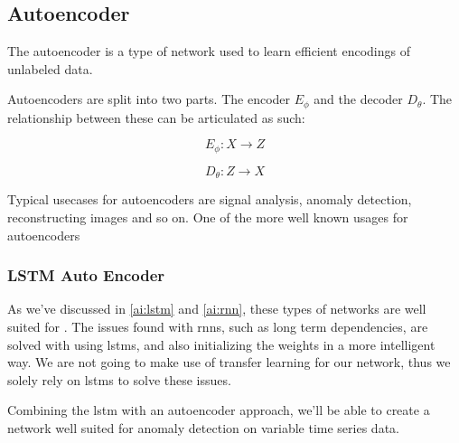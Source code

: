 \subsection{Autoencoder}

The autoencoder is a type of network used to learn efficient encodings of unlabeled data. 

Autoencoders are split into two parts. The encoder $E_\phi$ and the decoder $D_\theta$. The relationship between these can be articulated as such: 

\begin{equation}
E_\phi: X \rightarrow Z 
\end{equation}

\begin{equation}
D_\theta: Z \rightarrow X
\end{equation}


Typical usecases for autoencoders are signal analysis, anomaly detection, reconstructing images and so on. 
One of the more well known usages for autoencoders

\subsubsection{LSTM Auto Encoder}

As we've discussed in \ref{ai:lstm} and \ref{ai:rnn}, these types of networks are well suited for . The issues found with \acrshort{rnn}s, such as long term dependencies, are solved with using \acrshort{lstm}s, and also initializing the weights in a more intelligent way. We are not going to make use of transfer learning for our network, thus we solely rely on \acrshort{lstm}s to solve these issues.

Combining the \acrshort{lstm} with an autoencoder approach, we'll be able to create a network well suited for anomaly detection on variable time series data.
